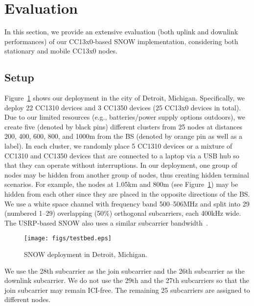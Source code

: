 \section{Evaluation}\label{sec:eval}
In this section, we provide an extensive evaluation (both uplink and downlink performances) of our CC13x0-based SNOW implementation, considering both stationary and mobile CC13x0 nodes.

\subsection{Setup}\label{sec:expsetup}
Figure~\ref{fig:testbed} shows our deployment in the city of Detroit, Michigan. Specifically, we deploy 22 CC1310 devices and 3 CC1350 devices (25 CC13x0 devices in total).
Due to our limited resources (e.g., batteries/power supply options outdoors), we create five (denoted by black pins) different clusters from 25 nodes at distances 200, 400, 600, 800, and 1000m from the BS (denoted by orange pin as well as a label). In each cluster, we randomly place 5 CC1310 devices or a mixture of CC1310 and CC1350 devices that are connected to a laptop via a USB hub so that they can operate without interruptions.
In our deployment, one group of nodes may be hidden from another group of nodes, thus creating hidden terminal scenarios. For example, the nodes at 1.05km and 800m (see Figure~\ref{fig:testbed}) may be hidden from each other since they are placed in the opposite directions of the BS.
We use a white space channel with frequency band 500--506MHz and split into 29 (numbered 1--29) overlapping (50\%) orthogonal subcarriers, each 400kHz wide. The USRP-based SNOW also uses a similar subcarrier bandwidth~\cite{snow_ton}.
\begin{figure}[!htb]
\centering
\texttt{[image: figs/testbed.eps]}
\caption{SNOW deployment in Detroit, Michigan.}
\label{fig:testbed}
\end{figure}
We use the 28th subcarrier as the join subcarrier and the 26th subcarrier as the downlink subcarrier. We do not use the 29th and the 27th subcarriers so that the join subcarrier may remain ICI-free.
The remaining 25 subcarriers are assigned to different nodes.

